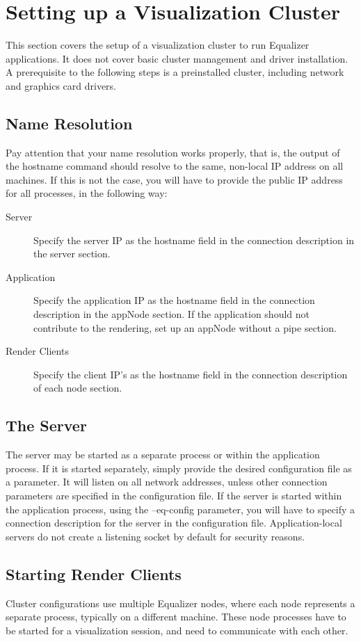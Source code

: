 \documentclass[10pt,a4]{scrartcl}
\begin{document}
\section{\label{sClusterSetup}Setting up a Visualization Cluster}
This section covers the setup of a visualization cluster to run Equalizer
applications. It does not cover basic cluster management and driver
installation. A prerequisite to the following steps is a preinstalled cluster,
including network and graphics card drivers.

\subsection{Name Resolution}
Pay attention that your name resolution works properly, that is, the output of
the hostname command should resolve to the same, non-local IP address on all
machines. If this is not the case, you will have to provide the public IP
address for all processes, in the following way:
\begin{description}
\item[Server] Specify the server IP as the hostname field in the connection
  description in the server section.
\item[Application] Specify the application IP as the hostname field in the
  connection description in the appNode section. If the application should not
  contribute to the rendering, set up an appNode without a pipe section.
\item[Render Clients] Specify the client IP's as the hostname field in the
  connection description of each node section.
\end{description}

\subsection{The Server}
The server may be started as a separate process or within the application
process. If it is started separately, simply provide the desired configuration
file as a parameter. It will listen on all network addresses, unless other
connection parameters are specified in the configuration file. If the
server is started within the application process, using the \textsf{--eq-config}
parameter, you will have to specify a connection description for the server in
the configuration file. Application-local servers do not create a listening
socket by default for security reasons.

\subsection{Starting Render Clients}
Cluster configurations use multiple Equalizer nodes, where each node represents
a separate process, typically on a different machine. These node processes have
to be started for a visualization session, and need to communicate with each
other.
\end{document}

